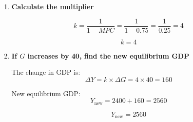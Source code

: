 \documentclass[12pt]{article}
\begin{document}
\begin{enumerate}[label=\textbf{\arabic*.}, start=9]
\begin{enumerate}
\[
Y = \frac{600}{0.25} = 2400
\]

\[
\boxed{Y = 2400}
\]

\item[(c)] \textbf{Calculate the multiplier}

\[
k = \frac{1}{1-MPC} = \frac{1}{1-0.75} = \frac{1}{0.25} = 4
\]

\[
\boxed{k = 4}
\]

\item[(d)] \textbf{If \(G\) increases by 40, find the new equilibrium GDP}

The change in GDP is:
\[
\Delta Y = k \times \Delta G = 4 \times 40 = 160
\]

New equilibrium GDP:
\[
Y_{\text{new}} = 2400 + 160 = 2560
\]

\[
\boxed{Y_{\text{new}} = 2560}
\]
\end{enumerate}

\end{enumerate}
\end{document}
